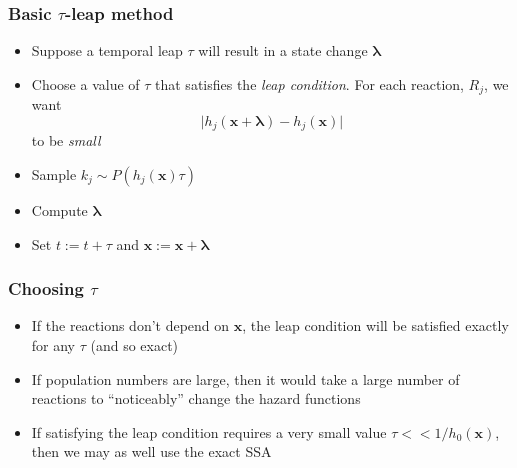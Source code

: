 \documentclass[t,compress]{beamer}
\begin{document}
\begin{frame}
\frametitle{Basic $\tau$-leap method}
\begin{itemize}
\item Suppose a temporal leap $\tau$ will result in a state change $\mathbf{\lambda}$
\item Choose a value of $\tau$ that satisfies the \textit{leap condition}. For
  each reaction, $R_j$, we want
\[
\vert h_j(\mathbf{x} + \mathbf{\lambda} )- h_j(\mathbf{x}) \vert 
\]
to be \textit{small}
\item Sample $k_j \sim P(h_j(\mathbf{x})\tau)$
\item Compute $\mathbf{\lambda}$
\item Set $t:= t + \tau$ and $\mathbf{x}:= \mathbf{x} + \mathbf{\lambda}$
\end{itemize}
\end{frame}

\begin{frame}
\frametitle{Choosing $\tau$}
\begin{itemize}
\item If the reactions don't depend on $\mathbf{x}$, the leap condition will be
  satisfied exactly for any $\tau$ (and so exact)
\item If population numbers are large, then it would take a large number of
  reactions to ``noticeably'' change the hazard functions
\item If satisfying the leap condition requires a very small value $\tau <<
  1/h_0(\mathbf{x})$, then we may as well use the exact SSA
\end{itemize}
\end{frame}
\end{document}

